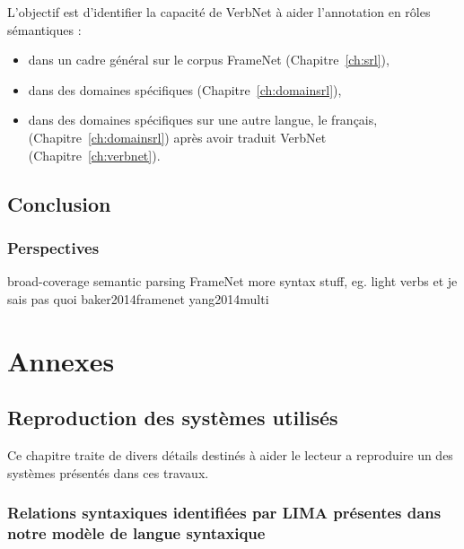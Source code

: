 \documentclass[oneside,parskip,draft]{scrbook}
\begin{document}
L'objectif est d'identifier la capacité de VerbNet à aider l'annotation en
rôles sémantiques :
\begin{itemize}
    \item dans un cadre général sur le corpus FrameNet (Chapitre~\ref{ch:srl}),
    \item dans des domaines spécifiques (Chapitre~\ref{ch:domainsrl}),
    \item dans des domaines spécifiques sur une autre langue, le français,
(Chapitre~\ref{ch:domainsrl}) après avoir traduit VerbNet
(Chapitre~\ref{ch:verbnet}).
\end{itemize}





\chapter*{Conclusion}
\label{ch:conc}

\section{Perspectives}

broad-coverage semantic parsing
FrameNet more syntax stuff, eg. light verbs et je sais pas quoi baker2014framenet yang2014multi

\backmatter




\part{Annexes}

\chapter{Reproduction des systèmes utilisés}

Ce chapitre traite de divers détails destinés à aider le lecteur a reproduire
un des systèmes présentés dans ces travaux.

\section{Relations syntaxiques identifiées par LIMA présentes dans notre modèle
de langue syntaxique}
\label{relations_modele_langue}
\end{document}
